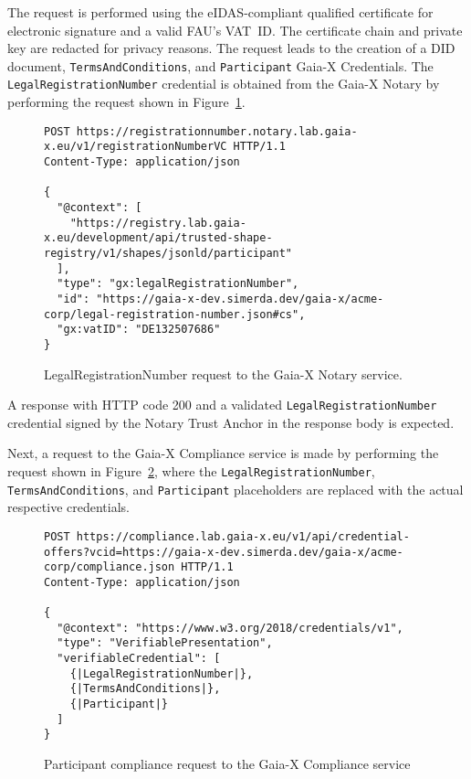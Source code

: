 The request is performed using the eIDAS-compliant qualified certificate for electronic signature and a valid FAU's VAT~ID.
The certificate chain and private key are redacted for privacy reasons.
The request leads to the creation of a DID document, \texttt{TermsAndConditions}, and \texttt{Participant} Gaia-X Credentials.
The \texttt{LegalRegistrationNumber} credential is obtained from the Gaia-X Notary by performing the request shown in Figure~\ref{fig:test_case_1_notary}.

\begin{figure}[h]
    \centering
    \begin{verbatim}
POST https://registrationnumber.notary.lab.gaia-x.eu/v1/registrationNumberVC HTTP/1.1
Content-Type: application/json

{
  "@context": [
    "https://registry.lab.gaia-x.eu/development/api/trusted-shape-registry/v1/shapes/jsonld/participant"
  ],
  "type": "gx:legalRegistrationNumber",
  "id": "https://gaia-x-dev.simerda.dev/gaia-x/acme-corp/legal-registration-number.json#cs",
  "gx:vatID": "DE132507686"
}
    \end{verbatim}
    \caption{LegalRegistrationNumber request to the Gaia-X Notary service.}\label{fig:test_case_1_notary}
\end{figure}

A response with HTTP code 200 and a validated \texttt{LegalRegistrationNumber} credential signed by the Notary Trust Anchor in the response body is expected.

Next, a request to the Gaia-X Compliance service is made by performing the request shown in Figure~\ref{fig:test_case_1_compliance}, where the \texttt{LegalRegistrationNumber}, \texttt{TermsAndConditions}, and \texttt{Participant} placeholders are replaced with the actual respective credentials.

\begin{figure}[h]
    \centering
    \begin{verbatim}
POST https://compliance.lab.gaia-x.eu/v1/api/credential-offers?vcid=https://gaia-x-dev.simerda.dev/gaia-x/acme-corp/compliance.json HTTP/1.1
Content-Type: application/json

{
  "@context": "https://www.w3.org/2018/credentials/v1",
  "type": "VerifiablePresentation",
  "verifiableCredential": [
    {|LegalRegistrationNumber|},
    {|TermsAndConditions|},
    {|Participant|}
  ]
}
    \end{verbatim}
    \caption{Participant compliance request to the Gaia-X Compliance service}\label{fig:test_case_1_compliance}
\end{figure}

